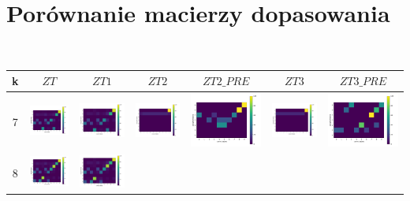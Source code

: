 \section*{Porównanie macierzy dopasowania}
\phantom{.}\\
\begin{tabular}{ |c|c|c|c|c|c|c| }
    \hline
        k & $ZT$ & $ZT1$ & $ZT2$ & $ZT2\_PRE$ & $ZT3$ & $ZT3\_PRE$ \\
    \hline
        7 & 
        \includegraphics[width=0.13\linewidth]{../results/7-clusters/accuracy - train.png} &
        \includegraphics[width=0.13\linewidth]{../results/7-clusters/accuracy - test 1.png} &
        \includegraphics[width=0.13\linewidth]{../results/7-clusters/accuracy - test 2.png} &
        \includegraphics[width=0.13\linewidth]{../results/7-clusters/accuracy - test 2 preprocessed.png} &
        \includegraphics[width=0.13\linewidth]{../results/7-clusters/accuracy - test 3.png} &
        \includegraphics[width=0.13\linewidth]{../results/7-clusters/accuracy - test 3 preprocessed.png} \\
    \hline
        8 & 
        \includegraphics[width=0.13\linewidth]{../results/8-clusters/accuracy - train.png} &
        \includegraphics[width=0.13\linewidth]{../results/8-clusters/accuracy - test 1.png} &

\end{tabular}
